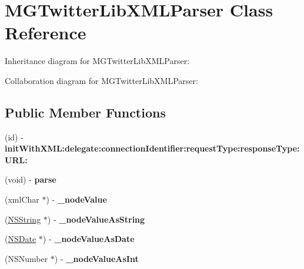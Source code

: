 \hypertarget{interface_m_g_twitter_lib_x_m_l_parser}{
\section{\-M\-G\-Twitter\-Lib\-X\-M\-L\-Parser \-Class \-Reference}
\label{interface_m_g_twitter_lib_x_m_l_parser}
}


\-Inheritance diagram for \-M\-G\-Twitter\-Lib\-X\-M\-L\-Parser\-:


\-Collaboration diagram for \-M\-G\-Twitter\-Lib\-X\-M\-L\-Parser\-:
\subsection*{\-Public \-Member \-Functions}
\begin{DoxyCompactItemize}
\item 
\hypertarget{interface_m_g_twitter_lib_x_m_l_parser_acc0666cd7ace21f35d0a1be69354f527}{
(id) -\/ {\bfseries init\-With\-X\-M\-L\-:delegate\-:connection\-Identifier\-:request\-Type\-:response\-Type\-:\-U\-R\-L\-:}}
\label{interface_m_g_twitter_lib_x_m_l_parser_acc0666cd7ace21f35d0a1be69354f527}

\item 
\hypertarget{interface_m_g_twitter_lib_x_m_l_parser_a8868f9b8f95ee8ee3d23655e331ef0a2}{
(void) -\/ {\bfseries parse}}
\label{interface_m_g_twitter_lib_x_m_l_parser_a8868f9b8f95ee8ee3d23655e331ef0a2}

\item 
\hypertarget{interface_m_g_twitter_lib_x_m_l_parser_a2f58b5a732f5380f2eea2810271546f3}{
(xml\-Char $\ast$) -\/ {\bfseries \-\_\-node\-Value}}
\label{interface_m_g_twitter_lib_x_m_l_parser_a2f58b5a732f5380f2eea2810271546f3}

\item 
\hypertarget{interface_m_g_twitter_lib_x_m_l_parser_abbf55407236cb146e6bce1ca1b664072}{
(\hyperlink{class_n_s_string}{\-N\-S\-String} $\ast$) -\/ {\bfseries \-\_\-node\-Value\-As\-String}}
\label{interface_m_g_twitter_lib_x_m_l_parser_abbf55407236cb146e6bce1ca1b664072}

\item 
\hypertarget{interface_m_g_twitter_lib_x_m_l_parser_af936b9cc2cde33e169ed960f44ecc21a}{
(\hyperlink{class_n_s_date}{\-N\-S\-Date} $\ast$) -\/ {\bfseries \-\_\-node\-Value\-As\-Date}}
\label{interface_m_g_twitter_lib_x_m_l_parser_af936b9cc2cde33e169ed960f44ecc21a}

\item 
\hypertarget{interface_m_g_twitter_lib_x_m_l_parser_ab6aff756b11021887c06ef5d4b38421d}{
(\-N\-S\-Number $\ast$) -\/ {\bfseries \-\_\-node\-Value\-As\-Int}}
\label{interface_m_g_twitter_lib_x_m_l_parser_ab6aff756b11021887c06ef5d4b38421d}


\end{DoxyCompactItemize}
